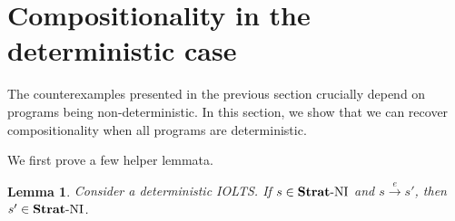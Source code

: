\documentclass[preprint,5p,twocolumn]{elsarticle}
\newtheorem{lemma}[theorem]{Lemma}
\begin{document}
\section{Compositionality in the deterministic case}

\label{sec:deterministic}

The counterexamples presented in the previous section crucially depend on programs being non-deterministic.
In this section, we show that we can recover compositionality when all programs are deterministic.

We first prove a few helper lemmata.
\begin{lemma}
  \label{thm:deterministic step}
  Consider a deterministic IOLTS. If $s \in \mathbf{Strat}\text{-}\mathrm{NI}$ and $s \xrightarrow{e} s'$, then
  $s' \in \mathbf{Strat}\text{-}\mathrm{NI}$.
\end{lemma}
\end{document}
